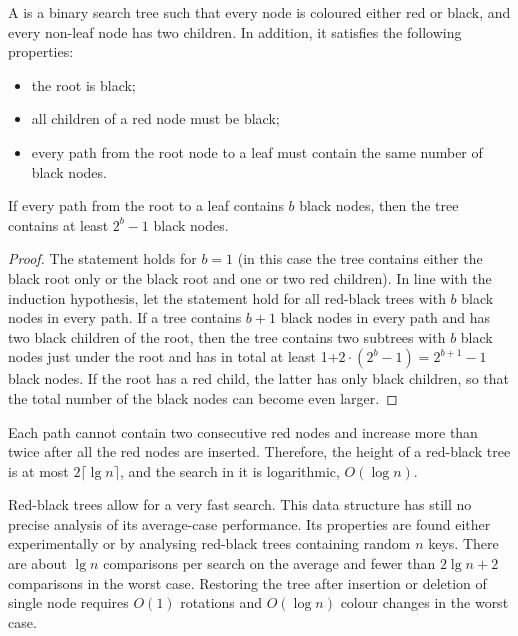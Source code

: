 \begin{Definition}
A  is a binary search tree such that 
every node is coloured either red or black, and every non-leaf node 
has two children. In addition, it satisfies the following properties: 
\begin{itemize}
\item the root is black;
\item all children of a red node must be black;
\item every path from the root node to a leaf must contain the same number of 
black nodes.
\end{itemize}
\end{Definition}

\begin{Theorem}
If every path from the root to a leaf contains $b$ black 
nodes, then the tree contains at least $2^{b}-1$ black nodes.
\end{Theorem}
\begin{proof}

The statement holds for $b=1$ (in this case
the tree contains either the black root only or the black
root and one or two red children). In line with the induction hypothesis, 
let the statement hold for all red-black trees with $b$ black nodes  in every 
path. If a tree contains $b+1$ black nodes in every path and has two black 
children of the root, then the tree contains two subtrees with $b$ black nodes 
just under the root and has in total at least 1+$2 \cdot(2^{b}-1) = 2^{b+1}-1$ 
black nodes. If the root has a red child, the latter has only black children, 
so that the total number of the black nodes can become even larger. 
\end{proof}

Each path cannot contain two consecutive red nodes and increase more
than twice after all the red nodes are inserted. Therefore, the height
of a red-black tree is at most $2\lceil \lg n \rceil$, and the
search in it is logarithmic, $O(\log n)$.

Red-black trees allow for a very fast search. This data structure has
still no precise analysis of its average-case performance. Its
properties are found either experimentally or by analysing red-black
trees containing random $n$ keys. There are about $\lg n$ comparisons per search 
on the average and fewer than $2\lg n + 2$ comparisons in the
worst case. Restoring the tree after insertion or deletion of single node 
requires $O(1)$ rotations and $O(\log n)$ colour changes in the worst case.

